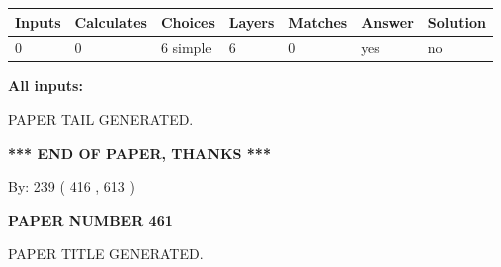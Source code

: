 \documentclass[12pt]{article}
\begin{document}
   
\noindent\begin{tabular}{|l|l|l|l|l|l|l|}
 \hline
Inputs & Calculates & Choices & Layers & Matches & Answer & Solution \\ \hline
 0  & 
 0  & 
 6
  simple  
  & 
 6  & 
 0  & 
  yes & 
  no 
  \\ \hline
 \end{tabular}
   
   
   
   
\noindent{}
   
   
   
   
\noindent\vspace{0.1in}\hspace{-0.08in} {\textbf{\Large{All inputs: }}}
   
   
   
   
   
   
 \vspace{0.2in}
 
   
   
\vspace{2.0in} PAPER TAIL GENERATED.
   
   
   
   
\vspace{1.0in} 
{\textbf{\large{ *** END OF PAPER, THANKS *** }}} 
   
   
\hspace{1.0in} By: 
 239 ( 416 ,  613 )
   
   
   
   
\newpage 
\setcounter{page}{ 
   461001 } 
   
   
   
   
 {\textbf{ \Large{ PAPER NUMBER  461  }}}
   
   
\vspace{0.2in}
   
   
   
   
   
   
   
   
 \vspace{0.2in}
 
 
 
 
   
   
 PAPER TITLE GENERATED.
   
   
   
\vspace{0.2in}
   
\end{document}
